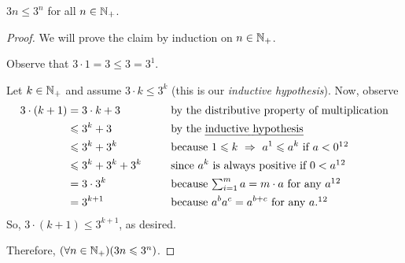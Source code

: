 \begin{example}
    $3n \leq 3^n$ for all $n \in \mathbb{N}_+$.
\end{example}
\begin{proof}
    We will prove the claim by induction on $n \in \mathbb{N}_+$.
    \begin{case}
        Observe that $3 \cdot 1 = 3 \leq 3 = 3^1$.
    \end{case}
    \begin{case}
        Let $k \in \mathbb{N}_+$ and assume $3 \cdot k \leq 3^k$
        (this is our \emph{inductive hypothesis}).
        Now, observe
        \begin{alignat*}{2}
            3 \cdot (k + 1) &= 3 \cdot k + 3 &&\text{ by the distributive property of multiplication} \\
                            &\leq 3^k + 3 &&\text{ by the \emph{inductive hypothesis}} \\
                            &\leq 3^k + 3^k &&\text{ because $1 \leq k \implies a^1 \leq a^k$ if $a < 0$}\footnotemark[1]\footnotemark[2] \\
                            &\leq 3^k + 3^k + 3^k~~~~&&\text{ since $a^k$ is always positive if $0 < a$}\footnotemark[1]\footnotemark[2] \\
                            &= 3 \cdot 3^k &&\text{ because $\textstyle \sum_{i = 1}^{m}a = m \cdot a$ for any $a$}\footnotemark[1]\footnotemark[2] \\
                            &= 3^{k + 1} &&\text{ because $a^ba^c = a^{b + c}$ for any $a$}.\footnotemark[1]\footnotemark[2]
        \end{alignat*}
        So, $3 \cdot (k + 1) \leq 3^{k + 1}$, as desired.
    \end{case}
    Therefore, $\pn*{\forall n \in \N_+}\pn*{3n \leq 3^n}$.
\end{proof}


